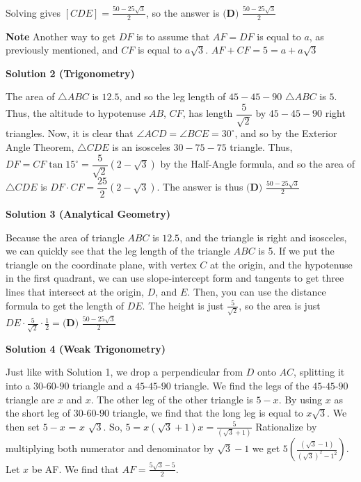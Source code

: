 \begin{enumerate}
 Solving gives $[CDE] = \frac{50 - 25\sqrt{3}}{2}$, so the answer is $\boxed{\textbf{(D) }\frac{50 - 25\sqrt{3}}{2}}$

 \textbf{Note} Another way to get $DF$ is to assume that $AF=DF$ is equal to $a$, as previously mentioned, and $CF$ is equal to $a\sqrt{3}$. $AF+CF=5=a+a\sqrt{3}$




\textbf{Solution 2 (Trigonometry)}

The area of $\triangle ABC$ is $12.5$, and so the leg length of $45 - 45 - 90$ $\triangle ABC$ is $5.$ Thus, the altitude to hypotenuse $AB$, $CF$, has length $\dfrac{5}{\sqrt{2}}$ by $45 - 45 - 90$ right triangles. Now, it is clear that $\angle{ACD} = \angle{BCE} = 30^\circ$, and so by the Exterior Angle Theorem, $\triangle{CDE}$ is an isosceles $30 - 75 - 75$ triangle. Thus, $DF = CF \tan 15^\circ = \dfrac{5}{\sqrt{2}} (2 - \sqrt{3})$ by the Half-Angle formula, and so the area of $\triangle CDE$ is $DF \cdot CF = \dfrac{25}{2} (2 - \sqrt{3})$. The answer is thus $\boxed{\textbf{(D) } \frac{50 - 25\sqrt{3}}{2}}$




\textbf{Solution 3 (Analytical Geometry)}

Because the area of triangle $ABC$ is $12.5$, and the triangle is right and isosceles, we can quickly see that the leg length of the triangle $ABC$ is 5. If we put the triangle on the coordinate plane, with vertex $C$ at the origin, and the hypotenuse in the first quadrant, we can use slope-intercept form and tangents to get three lines that intersect at the origin, $D$, and $E$. Then, you can use the distance formula to get the length of $DE$. The height is just $\frac{5}{\sqrt{2}}$, so the area is just $DE \cdot \frac{5}{\sqrt{2}} \cdot \frac{1}{2}=\boxed{\textbf{(D) } \frac{50 - 25\sqrt{3}}{2}}$




\textbf{Solution 4 (Weak Trigonometry)}

Just like with Solution 1, we drop a perpendicular from $D$ onto $AC$, splitting it into a $30$-$60$-$90$ triangle and a $45$-$45$-$90$ triangle. We find the legs of the $45$-$45$-$90$ triangle are $x$ and $x$. The other leg of the other triangle is $5-x$. By  using $x$ as the short leg of $30$-$60$-$90$ triangle, we find that the long leg is equal to $x\sqrt{3}$. We then set $5-x$ = $x$ $\sqrt{3}$. So, $5 = x(\sqrt{3}+1) x = \frac{5}{(\sqrt{3}+1)}$ Rationalize by multiplying both numerator and denominator by $\sqrt{3}-1$  we get $5(\frac{(\sqrt{3}-1)}{(\sqrt{3})^2-1^2})$. Let $x$ be AF. We find that $AF=\frac{5\sqrt{3}-5}{2}$.


\end{enumerate}

